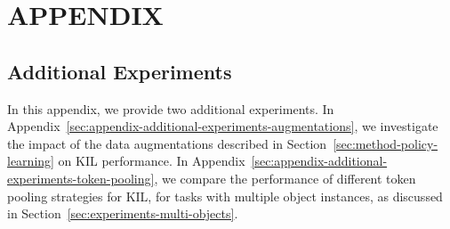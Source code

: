 \documentclass[letterpaper, 10 pt, conference]{ieeeconf}  %
\newif\ifappendixincluded
\begin{document}






\ifappendixincluded

\clearpage
\onecolumn %

\section*{APPENDIX}
\FloatBarrier %

\setcounter{subsection}{0}
\renewcommand{\thesubsection}{\Alph{subsection}}
\renewcommand{\thesubsubsection}{\Alph{subsection}.\arabic{subsubsection}}



\subsection{Additional Experiments}
\label{sec:appendix-additional-experiments}
In this appendix, we provide two additional experiments. In Appendix~\ref{sec:appendix-additional-experiments-augmentations}, we investigate the impact of the data augmentations described in Section~\ref{sec:method-policy-learning} on KIL performance. In Appendix~\ref{sec:appendix-additional-experiments-token-pooling}, we compare the performance of different token pooling strategies for KIL, for tasks with multiple object instances, as discussed in Section~\ref{sec:experiments-multi-objects}.
\end{document}
